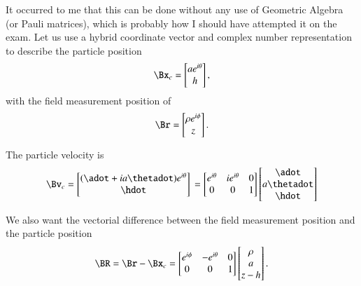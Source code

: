 {It occurred to me that this can be done without any use of Geometric Algebra (or Pauli matrices), which is probably how I should have attempted it on the exam.  Let us use a hybrid coordinate vector and complex number representation to describe the particle position
%
\begin{equation}\label{eqn:relativisticElectrodynamicsExamReflection:800}
\Bx_c =
\begin{bmatrix}
a e^{i\theta} \\
h
\end{bmatrix},
\end{equation}
with the field measurement position of
\begin{equation}\label{eqn:relativisticElectrodynamicsExamReflection:820}
\Br =
\begin{bmatrix}
\rho e^{i\phi} \\
z
\end{bmatrix}.
\end{equation}

The particle velocity is
%
\begin{equation}\label{eqn:relativisticElectrodynamicsExamReflection:840}
\Bv_c
=
\begin{bmatrix}
(\adot + i a \thetadot) e^{i\theta} \\
\hdot
\end{bmatrix} \\
=
\begin{bmatrix}
e^{i\theta} & i e^{i\theta} & 0 \\
0 & 0 & 1
\end{bmatrix}
\begin{bmatrix}
\adot \\
a \thetadot \\
\hdot
\end{bmatrix}
\end{equation}

We also want the vectorial difference between the field measurement position and the particle position
%
\begin{equation}\label{eqn:relativisticElectrodynamicsExamReflection:860}
\BR = \Br - \Bx_c =
\begin{bmatrix}
e^{i\phi} & -e^{i\theta} & 0 \\
0 & 0 & 1
\end{bmatrix}
\begin{bmatrix}
\rho \\
a \\
z - h
\end{bmatrix}.
\end{equation}

}
